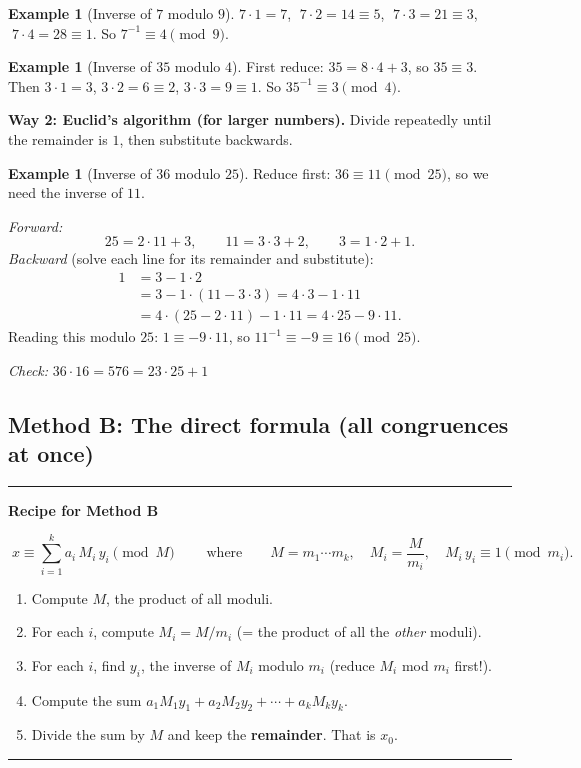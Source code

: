 \documentclass[11pt]{article}
\theoremstyle{definition}
\newtheorem{example}[theorem]{Example}
\theoremstyle{remark}
\newenvironment{recipe}[1]{\par\medskip\noindent\begin{minipage}{\linewidth}\noindent\rule{\linewidth}{0.8pt}\par\smallskip\noindent\textbf{#1}\par\smallskip}{\par\noindent\rule{\linewidth}{0.8pt}\end{minipage}\par\medskip}
\begin{document}
\begin{example}[Inverse of $7$ modulo $9$]
$7\cdot1=7$, $\;7\cdot2=14\equiv5$, $\;7\cdot3=21\equiv3$, $\;7\cdot4=28\equiv1$. So $7^{-1}\equiv 4\pmod 9$.
\end{example}

\begin{example}[Inverse of $35$ modulo $4$]
First reduce: $35=8\cdot4+3$, so $35\equiv3$. Then $3\cdot1=3$, $3\cdot2=6\equiv2$, $3\cdot3=9\equiv1$. So $35^{-1}\equiv3\pmod 4$.
\end{example}

\textbf{Way 2: Euclid's algorithm (for larger numbers).}
Divide repeatedly until the remainder is $1$, then substitute backwards.

\begin{example}[Inverse of $36$ modulo $25$]
Reduce first: $36\equiv 11\pmod{25}$, so we need the inverse of $11$.

\emph{Forward:}
\[
25=2\cdot11+3,\qquad 11=3\cdot3+2,\qquad 3=1\cdot2+1.
\]
\emph{Backward} (solve each line for its remainder and substitute):
\begin{align*}
1 &= 3-1\cdot 2\\
  &= 3-1\cdot(11-3\cdot3) = 4\cdot3-1\cdot11\\
  &= 4\cdot(25-2\cdot11)-1\cdot11 = 4\cdot25-9\cdot11.
\end{align*}
Reading this modulo $25$: $1\equiv -9\cdot 11$, so $11^{-1}\equiv -9\equiv 16\pmod{25}$.

\emph{Check:} $36\cdot16=576=23\cdot25+1$ \checkmark
\end{example}

\subsection{Method B: The direct formula (all congruences at once)}

\begin{recipe}{Recipe for Method B}
\[
\boxed{\;x\equiv \sum_{i=1}^{k} a_i\,M_i\,y_i \pmod M\;}
\qquad\text{where}\qquad
M=m_1\cdots m_k,\quad M_i=\frac{M}{m_i},\quad M_i\,y_i\equiv 1 \pmod{m_i}.
\]
\begin{enumerate}[leftmargin=1.6em,itemsep=2pt]
\item Compute $M$, the product of all moduli.
\item For each $i$, compute $M_i=M/m_i$ (= the product of all the \emph{other} moduli).
\item For each $i$, find $y_i$, the inverse of $M_i$ modulo $m_i$ (reduce $M_i$ mod $m_i$ first!).
\item Compute the sum $a_1M_1y_1+a_2M_2y_2+\cdots+a_kM_ky_k$.
\item Divide the sum by $M$ and keep the \textbf{remainder}. That is $x_0$.
\end{enumerate}
\end{recipe}
\end{document}

